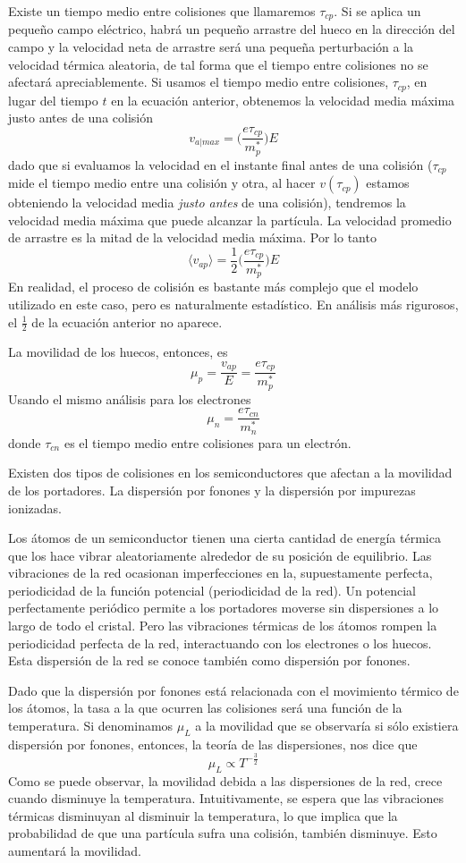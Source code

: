 \documentclass[12pt,a4paper]{article}
\begin{document}
Existe un tiempo medio entre colisiones que llamaremos $\tau _{cp}$. Si se aplica un pequeño campo eléctrico, habrá un pequeño arrastre del hueco en la dirección del campo y la velocidad neta de arrastre será una pequeña perturbación a la velocidad térmica aleatoria, de tal forma que el tiempo entre colisiones no se afectará apreciablemente. Si usamos el tiempo medio entre colisiones, $\tau _{cp}$, en lugar del tiempo $t$ en la ecuación anterior, obtenemos la velocidad media máxima justo antes de una colisión
\[ v_{a|max}=\bigg( \frac{e \tau _{cp}}{m_{p}^{\ast}} \bigg) E \]
dado que si evaluamos la velocidad en el instante final antes de una colisión ($\tau _{cp}$ mide el tiempo medio entre una colisión y otra, al hacer $v(\tau _{cp})$ estamos obteniendo la velocidad media \emph{justo antes} de una colisión), tendremos la velocidad media máxima que puede alcanzar la partícula. La velocidad promedio de arrastre es la mitad de la velocidad media máxima. Por lo tanto
\[ \langle v_{ap} \rangle = \frac{1}{2} \bigg( \frac{e \tau _{cp}}{m_{p}^{\ast}} \bigg) E \]
En realidad, el proceso de colisión es bastante más complejo que el modelo utilizado en este caso, pero es naturalmente estadístico. En análisis más rigurosos, el $\frac{1}{2}$ de la ecuación anterior no aparece.

La movilidad de los huecos, entonces, es
\[ \mu _{p} = \frac{v_{ap}}{E} = \frac{e \tau _{cp}}{m_{p}^{\ast}} \]
Usando el mismo análisis para los electrones
\[ \mu _{n} = \frac{e \tau _{cn}}{m_{n}^{\ast}} \]
donde $\tau _{cn}$ es el tiempo medio entre colisiones para un electrón.

Existen dos tipos de colisiones en los semiconductores que afectan a la movilidad de los portadores. La dispersión por fonones y la dispersión por impurezas ionizadas.

Los átomos de un semiconductor tienen una cierta cantidad de energía térmica que los hace vibrar aleatoriamente alrededor de su posición de equilibrio. Las vibraciones de la red ocasionan imperfecciones en la, supuestamente perfecta, periodicidad de la función potencial (periodicidad de la red). Un potencial perfectamente periódico permite a los portadores moverse sin dispersiones a lo largo de todo el cristal. Pero las vibraciones térmicas de los átomos rompen la periodicidad perfecta de la red, interactuando con los electrones o los huecos. Esta dispersión de la red se conoce también como dispersión por fonones.

Dado que la dispersión por fonones está relacionada con el movimiento térmico de los átomos, la tasa a la que ocurren las colisiones será una función de la temperatura. Si denominamos $\mu _{L}$ a la movilidad que se observaría si sólo existiera dispersión por fonones, entonces, la teoría de las dispersiones, nos dice que
\[ \mu _{L} \propto T^{-\frac{3}{2}} \]
Como se puede observar, la movilidad debida a las dispersiones de la red, crece cuando disminuye la temperatura. Intuitivamente, se espera que las vibraciones térmicas disminuyan al disminuir la temperatura, lo que implica que la probabilidad de que una partícula sufra una colisión, también disminuye. Esto aumentará la movilidad.
\end{document}
